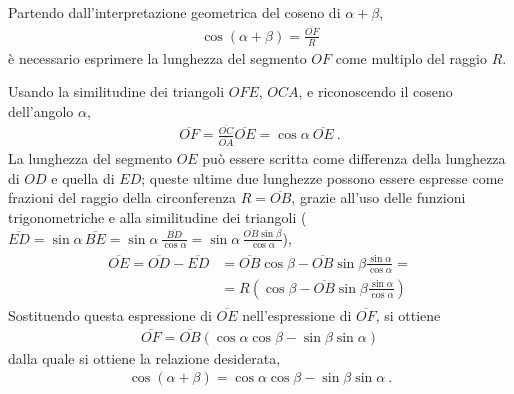 \documentclass[letterpaper,10pt,italian]{jupyterBook}
\begin{document}
\begin{figure}[htbp]
\centering

\noindent{}
\end{figure}

\sphinxAtStartPar
Partendo dall’interpretazione geometrica del coseno di \(\alpha + \beta\),
\begin{equation*}
\begin{split}\cos ( \alpha + \beta ) = \frac{\overline{OF}}{R}\end{split}
\end{equation*}
\sphinxAtStartPar
è necessario esprimere la lunghezza del segmento \(OF\) come multiplo del raggio \(R\).



\sphinxAtStartPar
Usando la similitudine dei triangoli \(OFE\), \(OCA\), e riconoscendo il coseno dell’angolo \(\alpha\),
\begin{equation*}
\begin{split}\overline{OF} = \frac{\overline{OC}}{\overline{OA}} \overline{OE} = \cos \alpha \ \overline{OE} \ .\end{split}
\end{equation*}
\sphinxAtStartPar
La lunghezza del segmento \(OE\) può essere scritta come differenza della lunghezza di \(OD\) e quella di \(ED\); queste ultime due lunghezze possono essere espresse come frazioni del raggio della circonferenza \(R = \overline{OB}\), grazie all’uso delle funzioni trigonometriche e alla similitudine dei triangoli (\(\overline{ED} = \sin \alpha \, \overline{BE} = \sin \alpha \, \frac{\overline{BD}}{\cos \alpha} = \sin \alpha \, \frac{\overline{OB} \sin \beta}{\cos \alpha}\)),
\begin{equation*}
\begin{split}\begin{aligned}
\overline{OE} = \overline{OD} - \overline{ED} & = \overline{OB} \cos \beta - \overline{OB} \sin \beta \frac{\sin \alpha}{\cos \alpha} = \\
& = R \left( \cos \beta - \overline{OB} \sin \beta \frac{\sin \alpha}{\cos \alpha} \right)
\end{aligned}\end{split}
\end{equation*}
\sphinxAtStartPar
Sostituendo questa espressione di \(\overline{OE}\) nell’espressione di \(\overline{OF}\), si ottiene
\begin{equation*}
\begin{split}\overline{OF} = \overline{OB} \left( \cos \alpha \cos \beta - \sin \beta \sin \alpha  \right)\end{split}
\end{equation*}
\sphinxAtStartPar
dalla quale si ottiene la relazione desiderata,
\begin{equation*}
\begin{split}\cos (\alpha + \beta) = \cos \alpha \cos \beta - \sin \beta \sin \alpha \ .\end{split}
\end{equation*}
\end{document}
